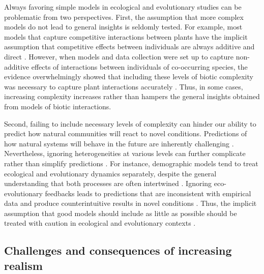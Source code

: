 \documentclass[12pt]{article}
\begin{document}
Always favoring simple models in ecological and evolutionary studies can be problematic from two perspectives. First, the assumption that more complex models do not lead to general insights is seldomly tested. For example, most models that capture competitive interactions between plants have the implicit assumption that competitive effects between individuals are always additive and direct \citep{schoener1974some,freckleton2001predicting,kraft2015plant}.  However, when models and data collection were set up to capture non-additive effects of interactions between individuals of co-occurring species, the evidence overwhelmingly showed that including these levels of biotic complexity was necessary to capture plant interactions accurately \citep{mayfield2017higher,martyn2021identifying,lai2021non}.  Thus, in some cases, increasing complexity increases rather than hampers the general insights obtained from models of biotic interactions.

Second, failing to include necessary levels of complexity can hinder our ability to predict how natural communities will react to novel conditions. Predictions of how natural systems will behave in the future are inherently challenging \citep{sutherland2006predicting}. Nevertheless, ignoring heterogeneities at various levels can further complicate rather than simplify predictions  \citep{evans2012predictive}. For instance, demographic models tend to treat ecological and evolutionary dynamics separately, despite the general understanding that both processes are often intertwined \citep{macarthur1962some,kokko2007ecogenetic}. Ignoring eco-evolutionary feedbacks leads to predictions that are inconsistent with empirical data and produce counterintuitive results in novel conditions \citep{kokko2007ecogenetic}. Thus, the implicit assumption that good models should include as little as possible should be treated with caution in ecological and evolutionary contexts \citep{evans2013simple, kokko2007ecogenetic,abrams2001describing}.



\subsection*{Challenges and consequences of increasing realism}
\end{document}
